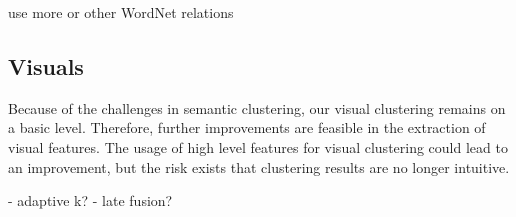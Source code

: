 use more or other WordNet relations\\

\subsection{Visuals}

Because of the challenges in semantic clustering, our visual clustering remains on a basic level. Therefore, further improvements are feasible in the extraction of visual features. The usage of high level features for visual clustering could lead to an improvement, but the risk exists that clustering results are no longer intuitive. 

\bigskip
- adaptive k?
- late fusion?